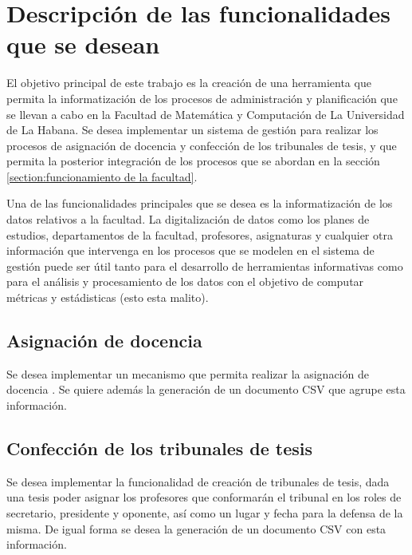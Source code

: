 \chapter{Descripción de las funcionalidades que se desean}\label{chapter:features}
El objetivo principal de este trabajo es la creación de
una herramienta que permita la informatización de los procesos
de administración y planificación que se llevan a cabo en la Facultad de Matemática y Computación
de La Universidad de La Habana. 
Se desea implementar un sistema de 
gestión para realizar los procesos de asignación de docencia y 
confección de los tribunales de tesis, y que permita 
la posterior integración de los procesos que se abordan en la 
sección \ref{section:funcionamiento de la facultad}.





Una de las funcionalidades principales que se desea es la informatización
de los datos relativos a la facultad. La digitalización de datos como 
los planes de estudios, departamentos de la facultad, profesores, asignaturas 
y cualquier otra información que intervenga en los procesos que se modelen en el sistema 
de gestión puede ser útil tanto para el desarrollo de herramientas informativas como
para el análisis y procesamiento de los datos con el objetivo de computar métricas y 
estádisticas (esto esta malito).








\section{Asignación de docencia}
Se desea implementar un mecanismo que permita realizar
la asignación de docencia .
Se quiere además la generación de un documento
CSV que agrupe esta información.


\section{Confección de los tribunales de tesis}
Se desea implementar la funcionalidad de creación
de tribunales de tesis, dada una tesis poder asignar
los profesores que conformarán el tribunal en los
roles de secretario, presidente y oponente, así como
un lugar y fecha para la defensa de la misma. De igual
forma se desea la generación de un documento CSV con
esta información.
